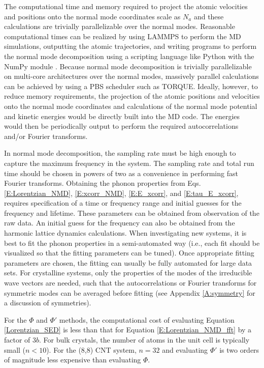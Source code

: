 The 
computational time and memory required to project the atomic velocities 
and positions onto the normal mode coordinates scale as $N_a$ and these 
calculations are trivially parallelizable over the normal modes. Reasonable 
computational times can be realized by using LAMMPS to perform the MD 
simulations, outputting the atomic trajectories, and writing programs to 
perform the normal mode decomposition using a scripting language like 
Python with the NumPy module \cite{dubois_numerical_1996}. 
Because normal mode 
decomposition is trivially parallelizable on multi-core architectures over 
the normal modes, massively parallel calculations can be achieved by using 
a PBS scheduler such as TORQUE. Ideally, however, to reduce memory 
requirements, the projection of the atomic positions and velocities onto 
the normal mode coordinates and calculations of the normal mode potential 
and kinetic energies would be directly built into the MD code. The energies 
would then be periodically output to perform the required autocorrelations 
and/or Fourier transforms.

In normal mode decomposition, the sampling rate must be high enough to 
capture the maximum frequency in the system. The sampling rate and total 
run time should be chosen in powers of two as a convenience in performing 
fast Fourier transforms. Obtaining the phonon properties from 
Eqs. \eqref{E:Lorentzian_NMD}, \eqref{E:xcorr_NMD}, 
\eqref{E:E_xcorr}, and \eqref{E:tau_E_xcorr}, 
requires specification of a time or frequency 
range and initial guesses for the frequency and lifetime. These parameters 
can be obtained from observation of the raw data. An initial guess for the 
frequency can also be obtained from the harmonic lattice dynamics 
calculations. When investigating new systems, it is best to fit the phonon 
properties in a semi-automated way (i.e., each fit should be visualized so 
that the fitting parameters can be tuned). Once appropriate fitting 
parameters are chosen, the fitting can usually be fully automated for large 
data sets. For crystalline systems, only the properties of the modes of the 
irreducible wave vectors are needed, such that the autocorrelations or 
Fourier transforms for symmetric modes can be averaged before fitting 
(see Appendix \ref{A:symmetry} for a discussion of symmetries).

For the $\Phi$ and $\Phi'$ methods, the computational cost of 
evaluating Equation \eqref{Lorentzian_SED} is less than that for 
Equation \eqref{E:Lorentzian_NMD_fft} by a factor of $3b$. 
For bulk crystals, the number of atoms in the unit cell is 
typically small 
($n<10$).  For the (8,8) CNT system, $n=32$ and evaluating $\Phi'$ is 
two orders of magnitude 
less expensive than evaluating $\Phi$.

